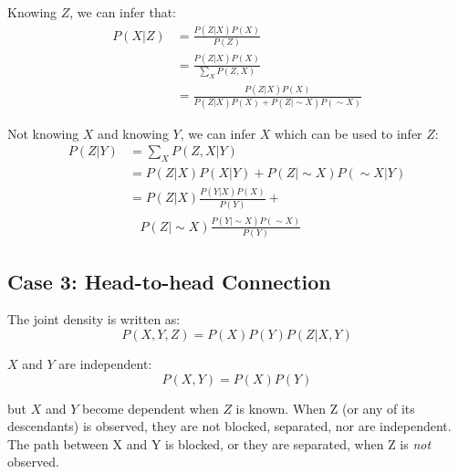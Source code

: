 \begin{multicols}{2}
\noindent Knowing $Z$, we can infer that:
\begin{equation*}
\begin{split}
    P(X|Z) &= \frac{P(Z|X)P(X)}{P(Z)} \\
    &= \frac{P(Z|X)P(X)}{\sum_X P(Z,X)} \\
    &= \frac{P(Z|X)P(X)}{P(Z|X)P(X) +P(Z|\sim X)P(\sim X) }
\end{split}
\end{equation*}

\noindent Not knowing $X$ and knowing $Y$, we can infer $X$ which can be used to infer $Z$:
\begin{equation*}
\begin{split}
    P(Z|Y) &= \sum_X P(Z,X|Y)\\
    &= P(Z|X)P(X|Y) + P(Z|\sim X)P(\sim X|Y) \\
    &= P(Z|X) \frac{P(Y|X)P(X)}{P(Y)} + \\
    & \ \ \ \ P(Z|\sim X) \frac{P(Y| \sim X) P(\sim X)}{P(Y)}
\end{split}
\end{equation*}

\subsection{Case 3: Head-to-head Connection}
\begin{center}
\end{center}

\noindent The joint density is written as:
$$P(X,Y,Z) = P(X) P(Y) P(Z|X,Y)$$

\noindent $X$ and $Y$ are independent:
$$P(X,Y)=P(X)P(Y)$$

\noindent but $X$ and $Y$ become dependent when $Z$ is known. When Z (or any of its descendants) is observed, they are not blocked, separated, nor are independent. The path between X and Y is blocked, or they are separated, when Z is \textit{not} observed.


\end{multicols}
